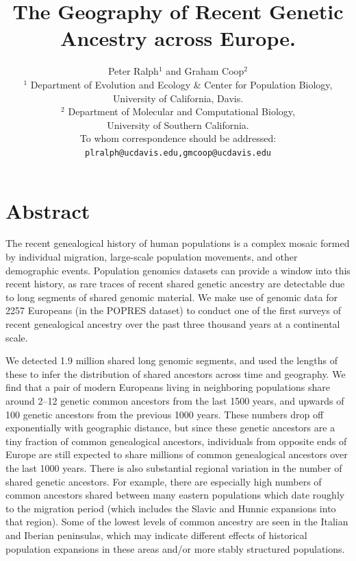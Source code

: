 \documentclass{article}
\begin{document}
\title{The Geography of Recent Genetic Ancestry across Europe.}
\author{Peter Ralph$^{1}$ and Graham Coop$^{2}$ \\
\small $^1$ Department of Evolution and Ecology \& Center for Population Biology,\\
\small University of California, Davis.\\
\small $^2$ Department of Molecular and Computational Biology,\\
\small University of Southern California.\\
\small To whom correspondence should be addressed: \texttt{plralph@ucdavis.edu,gmcoop@ucdavis.edu}\\
}
\date{}
\maketitle

\section*{Abstract}


The recent genealogical history of human populations 
is a complex mosaic formed by individual migration, 
large-scale population movements, 
and other demographic events.
Population genomics datasets can provide a window into this recent history,
as rare traces of recent shared genetic ancestry
are detectable due to long segments of shared genomic material.
We make use of genomic data for 2257 Europeans (in the POPRES dataset)
to conduct one of the first surveys of recent genealogical ancestry over the past three thousand years at a continental scale.  

We detected 1.9 million shared long genomic segments,
and used the lengths of these to infer the distribution of shared ancestors across time and geography.
We find that a pair of modern Europeans living in neighboring populations 
share around 2--12 genetic common ancestors from the last 1500 years,
and upwards of 100 genetic ancestors from the previous 1000 years.
These numbers drop off exponentially with geographic distance,
but since these genetic ancestors are a tiny fraction of common genealogical ancestors,  
individuals from opposite ends of Europe are still expected to share 
millions of common genealogical ancestors over the last 1000 years.
There is also substantial regional variation in the number of shared genetic ancestors.
For example, there are especially high numbers of common ancestors shared between many eastern populations
which date roughly to the migration period (which includes the Slavic and Hunnic expansions into that region).
Some of the lowest levels of common ancestry are seen in the Italian and Iberian peninsulas,
which may indicate different effects of historical population expansions in these areas
and/or more stably structured populations.
\end{document}
